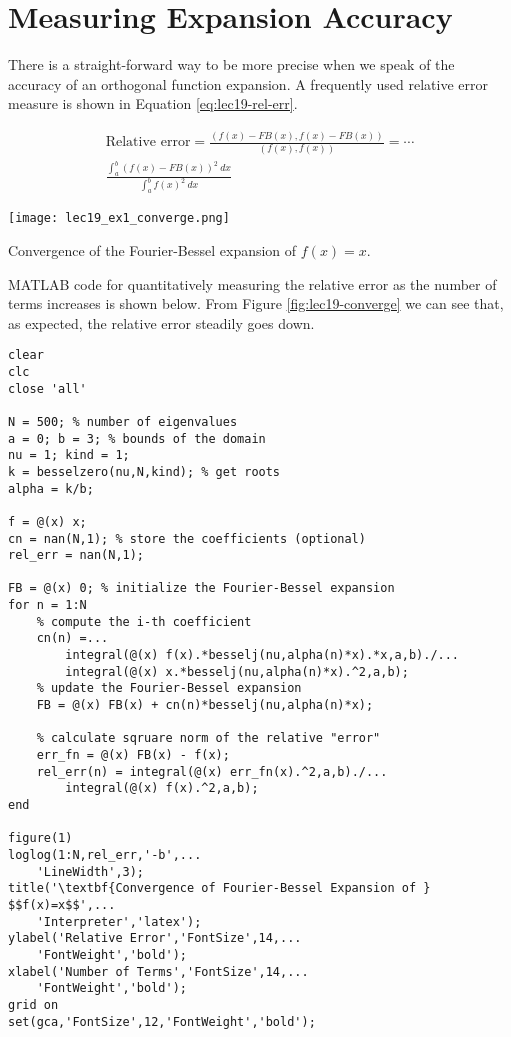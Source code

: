 \section{Measuring Expansion Accuracy}
There is a straight-forward way to be more precise when we speak of the accuracy of an orthogonal function expansion.  A frequently used relative error measure is shown in Equation \ref{eq:lec19-rel-err}.

\begin{multline}
\text{Relative error} = \frac{\left(f(x) - FB(x), f(x)-FB(x)\right)}{\left(f(x),f(x)\right)} = \cdots \\ \frac{\int_a^b \left(f(x)-FB(x)\right)^2 \ dx}{\int_a^b f(x)^2 \ dx}
\label{eq:lec19-rel-err}
\end{multline}
\begin{marginfigure}
\texttt{[image: lec19\_ex1\_converge.png]}
\caption{Convergence of the Fourier-Bessel expansion of $f(x)=x$.}
\label{fig:lec19-converge}
\end{marginfigure}
MATLAB code for quantitatively measuring the relative error as the number of terms increases is shown below.  From Figure \ref{fig:lec19-converge} we can see that, as expected, the relative error steadily goes down. 
\begin{lstlisting}[name=lec19-converge,style=myMatlab]
clear
clc
close 'all'

N = 500; % number of eigenvalues
a = 0; b = 3; % bounds of the domain
nu = 1; kind = 1;
k = besselzero(nu,N,kind); % get roots
alpha = k/b;

f = @(x) x; 
cn = nan(N,1); % store the coefficients (optional)
rel_err = nan(N,1); 

FB = @(x) 0; % initialize the Fourier-Bessel expansion
for n = 1:N
    % compute the i-th coefficient
    cn(n) =...
        integral(@(x) f(x).*besselj(nu,alpha(n)*x).*x,a,b)./...
        integral(@(x) x.*besselj(nu,alpha(n)*x).^2,a,b);
    % update the Fourier-Bessel expansion
    FB = @(x) FB(x) + cn(n)*besselj(nu,alpha(n)*x);

    % calculate sqruare norm of the relative "error"
    err_fn = @(x) FB(x) - f(x); 
    rel_err(n) = integral(@(x) err_fn(x).^2,a,b)./...
        integral(@(x) f(x).^2,a,b); 
end

figure(1)
loglog(1:N,rel_err,'-b',...
    'LineWidth',3);
title('\textbf{Convergence of Fourier-Bessel Expansion of } $$f(x)=x$$',...
    'Interpreter','latex');
ylabel('Relative Error','FontSize',14,...
    'FontWeight','bold');
xlabel('Number of Terms','FontSize',14,...
    'FontWeight','bold');
grid on
set(gca,'FontSize',12,'FontWeight','bold');
\end{lstlisting}


